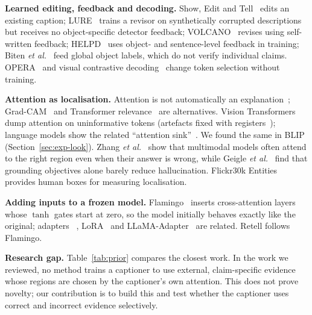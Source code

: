 \documentclass[conference]{IEEEtran}
\begin{document}
\textbf{Learned editing, feedback and decoding.} Show, Edit and Tell~\cite{sammani2020show} edits an existing
caption; LURE~\cite{zhou2024analyzing} trains a revisor on synthetically corrupted descriptions but receives no
object-specific detector feedback; VOLCANO~\cite{lee2024volcano} revises using self-written feedback;
HELPD~\cite{yuan2024helpd} uses object- and sentence-level feedback in training; Biten \emph{et
al.}~\cite{biten2022let} feed global object labels, which do not verify individual claims.
OPERA~\cite{huang2024opera} and visual contrastive decoding~\cite{leng2024mitigating} change token selection
without training.

\textbf{Attention as localisation.} Attention is not automatically an explanation~\cite{jain2019attention};
Grad-CAM~\cite{selvaraju2017grad} and Transformer relevance~\cite{chefer2021generic} are alternatives. Vision
Transformers dump attention on uninformative tokens (artefacts fixed with registers~\cite{darcet2024vision});
language models show the related ``attention sink''~\cite{xiao2024efficient}. We found the same in BLIP
(Section~\ref{sec:exp-look}). Zhang \emph{et al.}~\cite{zhang2025mllms} show that multimodal models often
attend to the right region even when their answer is wrong, while Geigle \emph{et al.}~\cite{geigle2024does}
find that grounding objectives alone barely reduce hallucination. Flickr30k
Entities~\cite{plummer2015flickr30k} provides human boxes for measuring localisation.

\textbf{Adding inputs to a frozen model.} Flamingo~\cite{alayrac2022flamingo} inserts cross-attention layers
whose $\tanh$ gates start at zero, so the model initially behaves exactly like the original; adapters~
\cite{houlsby2019parameter}, LoRA~\cite{hu2022lora} and LLaMA-Adapter~\cite{zhang2024llama} are related.
Retell follows Flamingo.

\textbf{Research gap.} Table~\ref{tab:prior} compares the closest work. In the work we reviewed, no method
trains a captioner to use external, claim-specific evidence whose regions are chosen by the captioner's own
attention. This does not prove novelty; our contribution is to build this and test whether the captioner uses
correct and incorrect evidence selectively.
\end{document}
